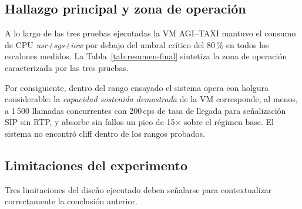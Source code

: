 \documentclass[conference]{IEEEtran}
\begin{document}
\subsection{Hallazgo principal y zona de operaci\'on}

A lo largo de las tres pruebas ejecutadas la VM AGI--TAXI mantuvo el
consumo de CPU \textit{usr+sys+iow} por debajo del umbral cr\'itico del
80\,\% en todos los escalones medidos. La Tabla~\ref{tab:resumen-final}
sintetiza la zona de operaci\'on caracterizada por las tres pruebas.

\begin{table}[!t]
\caption{Resumen consolidado de las tres pruebas de \textit{stress testing} aplicadas sobre la VM AGI--TAXI.}
\label{tab:resumen-final}
\renewcommand{\arraystretch}{1.2}
\setlength{\tabcolsep}{3pt}
\begin{center}
\end{center}
\end{table}

Por consiguiente, dentro del rango ensayado el sistema opera con
holgura considerable: la \textit{capacidad sostenida demostrada} de la
VM corresponde, al menos, a 1\,500 llamadas concurrentes con 200\,cps
de tasa de llegada para se\~nalizaci\'on SIP sin RTP, y absorbe sin
fallos un pico de 15$\times$ sobre el r\'egimen base. El sistema no
encontr\'o cliff dentro de los rangos probados.

\subsection{Limitaciones del experimento}

Tres limitaciones del dise\~no ejecutado deben se\~nalarse para
contextualizar correctamente la conclusi\'on anterior.
\end{document}
